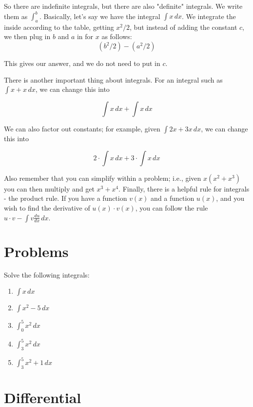 \documentclass[12pt]{article}
\begin{document}
So there are indefinite integrals, but there are also "definite" integrals. 
We write them as $\int^b_a$. Basically, let's say we have the integral $\int x \, dx$. 
We integrate the inside according to the table, getting $x^2/2$, but instead of adding the constant $c$, we then plug in $b$ and $a$ in for $x$ as follows: 
\begin{equation*}
    (b^2/2) - (a^2/2)
\end{equation*}

This gives our answer, and we do not need to put in $c$.

There is another important thing about integrals. For an integral such as $\int x+x \, dx$, we can change this into

\begin{equation*}
    \int x \, dx + \int x \, dx
\end{equation*}

We can also factor out constants; for example, given $\int 2x + 3x \, dx$, we can change this into 

\begin{equation*}
    2\cdot \int x \, dx + 3 \cdot \int x \, dx
\end{equation*}

Also remember that you can simplify within a problem; i.e., given $x(x^2 + x^3)$ you can then multiply and get $x^3 + x^4$. 
Finally, there is a helpful rule for integrals - the product rule. 
If you have a function $v(x)$ and a function $u(x)$, and you wish to find the derivative of $u(x)\cdot v(x)$, you can follow the rule $u\cdot v - \int v\frac{du}{dx}\, dx$. 

\section{Problems}
Solve the following integrals:

\begin{enumerate}
    \item $\int x \, dx$
    \item $\int x^2-5 \, dx$
    \item $\int^5_0 x^2 \, dx$
    \item $\int^5_3 x^2 \, dx$
    \item $\int^5_3 x^2 + 1 \, dx$
\end{enumerate}

\section{Differential}
\end{document}
